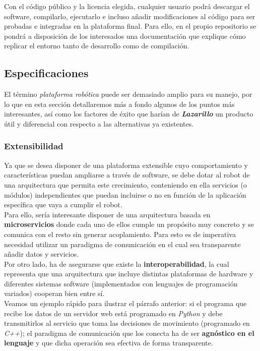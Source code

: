 Con el código público y la licencia elegida, cualquier usuario podrá descargar el software, compilarlo, ejecutarlo e incluso añadir modificaciones al código para ser probadas e integradas en la plataforma final. Para ello, en el propio repositorio se pondrá a disposición de los interesados una documentación que explique cómo replicar el entorno tanto de desarrollo como de compilación.\\


\subsection{Especificaciones}

El término \textit{plataforma robótica} puede ser demasiado amplio para su manejo, por lo que en esta sección detallaremos más a fondo algunos de los puntos más interesantes, así como los factores de éxito que harían de \textbf{\textit{Lazarillo}} un producto útil y diferencial con respecto a las alternativas ya existentes.\\


\subsubsection{Extensibilidad}

Ya que se desea disponer de una plataforma extensible cuyo comportamiento y características puedan ampliarse a través de software, se debe dotar al robot de una arquitectura que permita este crecimiento, conteniendo en ella servicios (o módulos) independientes que puedan incluirse o no en función de la aplicación específica que vaya a cumplir el robot.\\

Para ello, sería interesante disponer de una arquitectura basada en \textbf{microservicios} donde cada uno de ellos cumple un propósito muy concreto y se comunica con el resto sin generar acoplamiento. Para esto es de imperativa necesidad utilizar un paradigma de comunicación en el cual sea transparente añadir datos y servicios.\\

Por otro lado, ha de asegurarse que existe la \textbf{interoperabilidad}, la cual representa que una arquitectura que incluye distintas plataformas de hardware y diferentes sistemas software (implementados con lenguajes de programación variados) cooperan bien entre sí.\\

Veamos un ejemplo rápido para ilustrar el párrafo anterior: si el programa que recibe los datos de un servidor web está programado en \textit{Python} y debe transmitirlos al servicio que toma las decisiones de movimiento (programado en \textit{C++}); el paradigma de comunicación que los conecta ha de ser \textbf{agnóstico en el lenguaje} y que dicha operación sea efectiva de forma transparente.\\


